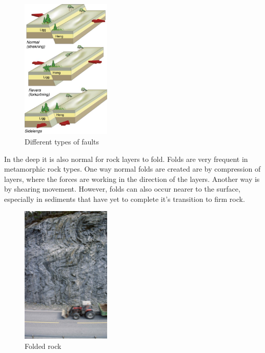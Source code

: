 \documentclass[a4paper,12pt]{report}
\begin{document}
\begin{figure}

  \begin{center}
    \includegraphics[width=0.38\textwidth]{thesis/geo/faults.png}
  \end{center}
 
  \caption{Different types of faults}
  \vspace{15pt}
  \label{fig:faults}
  
\end{figure}

In the deep it is also normal for rock layers to fold. Folds are very frequent in metamorphic rock types. One way normal folds are created are by compression of layers, where the forces are working in the direction of the layers. Another way is by shearing movement. However, folds can also occur nearer to the surface, especially in sediments that have yet to complete it's transition to firm rock.

\begin{figure}
  \begin{center}
    \includegraphics[width=0.38\textwidth]{thesis/geo/fold.png}
  \end{center}
  \caption{Folded rock}
  \label{fig:fold}
  
\end{figure}
\end{document}
